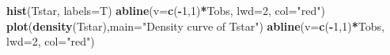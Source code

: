 \documentclass[]{book}
\newenvironment{Shaded}{\begin{snugshade}}{\end{snugshade}}
\newcommand{\KeywordTok}[1]{\textcolor[rgb]{0.13,0.29,0.53}{\textbf{#1}}}
\newcommand{\DataTypeTok}[1]{\textcolor[rgb]{0.13,0.29,0.53}{#1}}
\newcommand{\DecValTok}[1]{\textcolor[rgb]{0.00,0.00,0.81}{#1}}
\newcommand{\StringTok}[1]{\textcolor[rgb]{0.31,0.60,0.02}{#1}}
\newcommand{\OperatorTok}[1]{\textcolor[rgb]{0.81,0.36,0.00}{\textbf{#1}}}
\newcommand{\NormalTok}[1]{#1}
\begin{document}
\begin{Shaded}
\begin{Highlighting}[]
\KeywordTok{hist}\NormalTok{(Tstar, }\DataTypeTok{labels=}\NormalTok{T)}
\KeywordTok{abline}\NormalTok{(}\DataTypeTok{v=}\KeywordTok{c}\NormalTok{(}\OperatorTok{-}\DecValTok{1}\NormalTok{,}\DecValTok{1}\NormalTok{)}\OperatorTok{*}\NormalTok{Tobs, }\DataTypeTok{lwd=}\DecValTok{2}\NormalTok{, }\DataTypeTok{col=}\StringTok{"red"}\NormalTok{)}
\KeywordTok{plot}\NormalTok{(}\KeywordTok{density}\NormalTok{(Tstar),}\DataTypeTok{main=}\StringTok{"Density curve of Tstar"}\NormalTok{)}
\KeywordTok{abline}\NormalTok{(}\DataTypeTok{v=}\KeywordTok{c}\NormalTok{(}\OperatorTok{-}\DecValTok{1}\NormalTok{,}\DecValTok{1}\NormalTok{)}\OperatorTok{*}\NormalTok{Tobs, }\DataTypeTok{lwd=}\DecValTok{2}\NormalTok{, }\DataTypeTok{col=}\StringTok{"red"}\NormalTok{)}
\end{Highlighting}
\end{Shaded}
\end{document}
